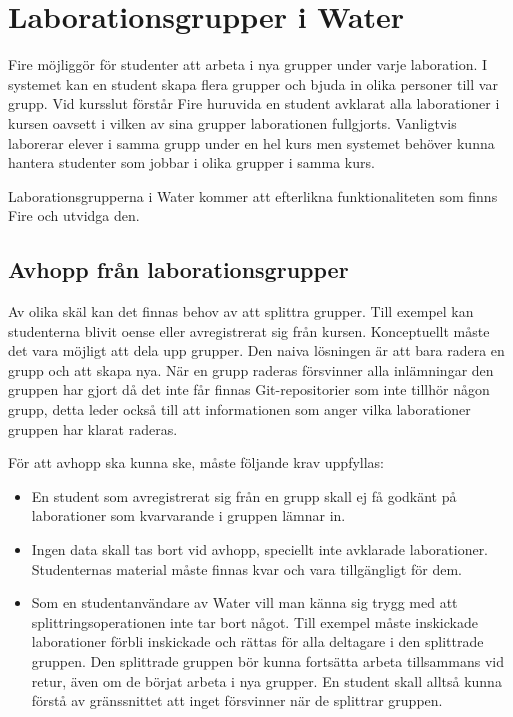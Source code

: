 \section{Laborationsgrupper i Water}

Fire möjliggör för studenter att arbeta i nya grupper under varje laboration. I systemet kan en student skapa flera grupper och bjuda in olika personer till var grupp. Vid kursslut förstår Fire huruvida en student avklarat alla laborationer i kursen oavsett i vilken av sina grupper laborationen fullgjorts. Vanligtvis laborerar elever i samma grupp under en  hel kurs men systemet behöver kunna hantera studenter som jobbar i olika grupper i samma kurs.

Laborationsgrupperna i Water kommer att efterlikna funktionaliteten som finns Fire och utvidga den.

\subsection{Avhopp från laborationsgrupper}

Av olika skäl kan det finnas behov av att splittra grupper. Till exempel kan
studenterna blivit oense eller avregistrerat sig från kursen. Konceptuellt
måste det vara möjligt att dela upp grupper. Den naiva lösningen är att bara
radera en grupp och att skapa nya. När en grupp raderas försvinner alla
inlämningar den gruppen har gjort då det inte får finnas Git-repositorier som
inte tillhör någon grupp, detta leder också till att informationen som anger
vilka laborationer gruppen har klarat raderas.

För att avhopp ska kunna ske, måste följande krav uppfyllas:
\begin{itemize}
  \item En student som avregistrerat sig från en grupp skall ej få godkänt på laborationer som kvarvarande i gruppen lämnar in.
  \item Ingen data skall tas bort vid avhopp, speciellt inte avklarade laborationer. Studenternas material måste finnas kvar och vara tillgängligt för dem.
  \item Som en studentanvändare av Water vill man känna sig trygg med att
    splittringsoperationen inte tar bort något. Till exempel måste inskickade
    laborationer förbli inskickade och rättas för alla deltagare i den
    splittrade gruppen. Den splittrade gruppen bör kunna fortsätta arbeta
    tillsammans vid retur, även om de börjat arbeta i nya grupper. En student
    skall alltså kunna förstå av gränssnittet att inget
    försvinner när de splittrar gruppen.
\end{itemize}


